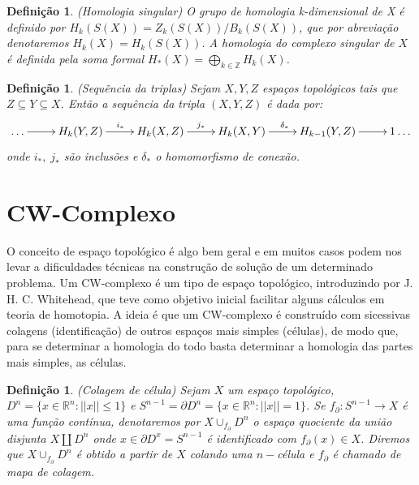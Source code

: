 \documentclass[12pt]{book}
\newtheorem{definicao}[teorema]{Definição}
\newcommand{\homologiarel}[3]{H_{#1}(#2,#3)}
\newcommand{\inteiros}{\mathbb{Z}}
\begin{document}
	\begin{definicao}
		(Homologia singular) O grupo de homologia k-dimensional de X é definido por $H_{k}(S(X)) = Z_{k}(S(X))/B_{k}(S(X))$, que por abreviação denotaremos $H_{k}(X)=H_{k}(S(X))$. A homologia do complexo singular de $X$ é definida pela soma formal $H_{*}(X) = \bigoplus_{k \in \inteiros}H_{k}(X)$.
	\end{definicao}
	
	\begin{definicao}
		(Sequência da triplas) Sejam $X, Y, Z$ espaços topológicos tais que $Z \subseteq Y \subseteq X$. Então a sequência da tripla $(X,Y,Z)$ é dada por:
		$$
		\xymatrix{
				\dots \ar[r] & \homologiarel{k}{Y}{Z} \ar[r]^{i_{*}} & \homologiarel{k}{X}{Z} \ar[r]^{j_{*}} & \homologiarel{k}{X}{Y} \ar[r]^{\delta_{*}} & \homologiarel{k-1}{Y}{Z} \ar[r] & 1\dots
		}
		$$
		onde $i_{*},\;j_{*}$ são inclusões e $\delta_{*}$ o homomorfismo de conexão.
	\end{definicao}
	
	\section{CW-Complexo}
	O conceito de espaço topológico é algo bem geral e em muitos casos podem nos levar a dificuldades técnicas na construção de solução de um determinado problema. Um CW-complexo é um tipo de espaço topológico, introduzindo por J. H. C. Whitehead, que teve como objetivo inicial facilitar alguns cálculos em teoria de homotopia. A ideia é que um CW-complexo é construído com sicessivas colagens (identificação) de outros espaços mais simples (células), de modo que, para se determinar a homologia do todo basta determinar a homologia das partes mais simples, as células.
	\begin{definicao}
		(Colagem de célula) Sejam $X$ um espaço topológico, $D^{n}=\{x\in \mathbb{R}^{n} : ||x|| \leq 1\}$ e $S^{n-1} = \partial D^{n}=\{x\in \mathbb{R}^{n} : ||x|| = 1\}$. Se $f_{\partial}:S^{n-1} \to X$ é uma função contínua, denotaremos por $X\cup_{f_{\partial}}D^{n}$ o espaço quociente da união disjunta $X \coprod D^{n}$ onde $x \in \partial D^{x} = S^{n-1}$ é identificado com $f_{\partial}(x) \in X$. Diremos que $X\cup_{f_{\partial}}D^{n}$ é obtido a partir de $X$ colando uma $n-$célula e $f_{\partial}$ é chamado de mapa de colagem.
 	\end{definicao}
	
\end{document}
